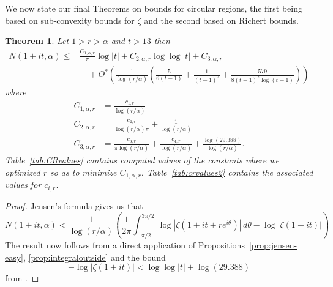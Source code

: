 \documentclass[10pt,english,letter, reqno]{amsart}
\newcommand{\Ostar}{O^{\ast}}
\theoremstyle{plain}
\newtheorem{theorem}{Theorem}
\theoremstyle{definition}
\begin{document}
We now state our final Theorems on bounds for circular regions, the first being based on sub-convexity bounds for $\zeta$ and the second based on Richert bounds.
\begin{theorem}\label{thm:circularregions1}
Let $1>r>\alpha$ and $t>13$ then
\begin{align*} N(1+it,\alpha) \leq&
\frac{C_{1,\alpha,r}}{\pi} \log|t| +
{C_{2,\alpha,r}} \log\log|t| +
C_{3,\alpha,r} \\&\quad+  \Ostar\!\left(\frac{1}{\log(r/\alpha)}\left(\frac{5}{6(t-1)} + \frac{1}{(t-1)^2} + \frac{579}{8(t-1)^2\log(t-1)}\right)\right)
\end{align*}
where
\begin{align*}
 C_{1,\alpha,r} &= \frac{c_{1,r}}{\log(r/\alpha)}\\
 C_{2,\alpha,r} &= \frac{c_{2,r}}{\log(r/\alpha)\pi} + \frac{1}{\log(r/\alpha)}\\
 C_{3,\alpha,r} &= \frac{c_{3,r}}{\pi\log(r/\alpha)} + \frac{c_{4,r}}{\log(r/\alpha)} + \frac{\log(29.388)}{\log(r/\alpha)}.
 \end{align*}
Table~\ref{tab:CRvalues} contains computed values of the constants where we optimized $r$ so as to minimize $C_{1,\alpha,r}$. Table~\ref{tab:crvalues2} contains the associated values for $c_{i,r}$.
\end{theorem}
\begin{proof}
Jensen's formula gives us that
\[ N(1+it,\alpha)  <   \frac{1}{\log(r/\alpha)}\left(  \frac{1}{2\pi}\int_{-\pi/2}^{3\pi/2} \log|\zeta(1+it+re^{i\theta})|\,d\theta - \log|\zeta(1+it)|   \right) \]
The result now follows from a direct application of Propositions~\ref{prop:jensen-easy}, \ref{prop:integraloutside} and the bound
\[ -\log|\zeta(1+it)| < \log\log|t| + \log(29.388) \]
from \cite{Leong2024}.  
\end{proof}
\end{document}
